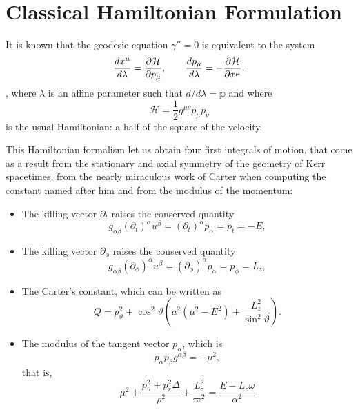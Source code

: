 \section{Classical Hamiltonian Formulation}

It is known \cite[Sec. 33.5]{thorne73} that the geodesic equation $\gamma'' = 0$ is equivalent to the system
\begin{equation*}
	\frac{dx^\mu}{d\lambda} = \frac{\partial^{} \mathcal{H}}{\partial p_\mu}, \qquad
	\frac{dp_\mu}{d\lambda} = - \frac{\partial^{} \mathcal{H}}{\partial x^\mu}.
\end{equation*},
where $\lambda$ is an affine parameter such that $d/d\lambda = \mathbb{p}$ and where
\[
	\mathcal{H} = \frac{1}{2} g^{\mu\nu} p_\mu p_\nu
\]
is the usual Hamiltonian: a half of the square of the velocity.

This Hamiltonian formalism let us obtain four first integrals of motion\cite[pp. 898-899]{thorne73}, that come as a result from the stationary and axial symmetry of the geometry of Kerr spacetimes, from the nearly miraculous work of Carter when computing the constant named after him and from the modulus of the momentum:
\begin{itemize}
	\item The killing vector $\partial_t$ raises the conserved quantity
	\[
		g_{\alpha\beta}(\partial_t)^\alpha u^\beta = (\partial_t)^\alpha p_\alpha = p_t = -E,
	\]
	\item The killing vector $\partial_\phi$ raises the conserved quantity
	\[
		g_{\alpha\beta}(\partial_\phi)^\alpha u^\beta = (\partial_\phi)^\alpha p_\alpha = p_\phi = L_z,
	\]
	\item The Carter's constant, which can be written as
	\begin{equation}
		\label{eq:carter}
		Q = p_\vartheta^2 + \cos^2\vartheta \left( a^2 \left( \mu^2 - E^2 \right) + \frac{L_z^2}{\sin^2\vartheta} \right).
	\end{equation}
	\item The modulus of the tangent vector $p_\alpha$, which is
	\begin{equation}
		\label{eq:modulus}
		p_\alpha p_\beta g^{\alpha\beta} = -\mu^2,
	\end{equation}
	that is,
	\[
		\mu^2 + \frac{p_\vartheta^2 + p_r^2 \Delta}{\rho^2} + \frac{L_z^2}{\varpi^2} = \frac{E - L_z \omega}{\alpha^2}
	\]
\end{itemize}



